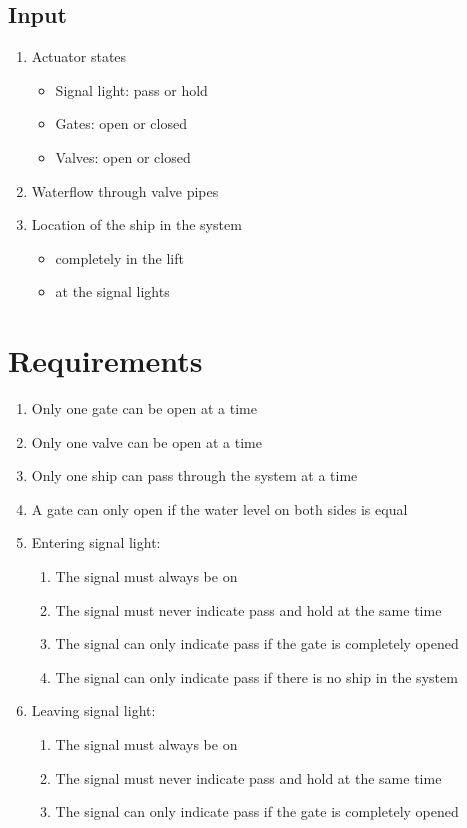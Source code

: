 \documentclass{article}
\begin{document}
\subsection{Input}
\begin{enumerate}
	\item Actuator states
	\begin{itemize}
		\item Signal light: pass or hold
		\item Gates: open or closed
		\item Valves: open or closed
	\end{itemize}
	\item Waterflow through valve pipes
	\item Location of the ship in the system
	\begin{itemize}
		\item completely in the lift
		\item at the signal lights
	\end{itemize}
\end{enumerate}

\section{Requirements}
\begin{enumerate}
	\item Only one gate can be open at a time
	\item Only one valve can be open at a time
	\item Only one ship can pass through the system at a time
	\item A gate can only open if the water level on both sides is equal
	\item Entering signal light:
		\begin{enumerate}
			\item The signal must always be on
			\item The signal must never indicate pass and hold at the same time
			\item The signal can only indicate pass if the gate is completely opened
			\item The signal can only indicate pass if there is no ship in the system
		\end{enumerate}
	\item Leaving signal light:
		\begin{enumerate}
			\item The signal must always be on
			\item The signal must never indicate pass and hold at the same time
			\item The signal can only indicate pass if the gate is completely opened
		\end{enumerate}
\end{enumerate}
\end{document}
